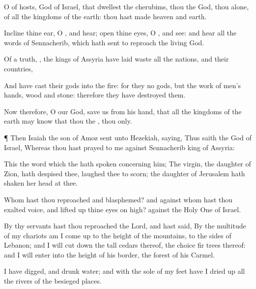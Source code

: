 {O
{} of
hosts,
God of
Israel, that
dwellest
{} the
cherubims, thou
{} the
God,
{} thou alone, of all the
kingdoms of the
earth: thou hast
made
heaven and
earth.

Incline thine
ear, O
{}, and
hear;
open thine
eyes, O
{}, and
see: and
hear all the
words of
Sennacherib, which hath
sent to
reproach the
living
God.

Of a
truth,
{}, the
kings of
Assyria have laid
waste all the
nations, and their
countries,

And have
cast their
gods into the
fire: for they
{} no
gods, but the
work of
men’s
hands,
wood and
stone: therefore they have
destroyed them.

Now therefore, O
{} our
God,
save us from his
hand, that all the
kingdoms of the
earth may
know that thou
{} the
{},
{} thou only.


\par }{\PP {}¶ Then
Isaiah the
son of
Amoz
sent unto
Hezekiah,
saying, Thus
saith the
{}
God of
Israel, Whereas thou hast
prayed to me against
Sennacherib
king of
Assyria:

This
{} the
word which the
{} hath
spoken concerning him; The
virgin, the
daughter of
Zion, hath
despised thee,
{} laughed thee to
scorn; the
daughter of
Jerusalem hath
shaken her
head at
thee.

Whom hast thou
reproached and
blasphemed? and against whom hast thou
exalted
{}
voice, and lifted
up thine
eyes on
high?
{} against the Holy
One of
Israel.

By thy
servants hast thou
reproached the
Lord, and hast
said, By the
multitude of my
chariots am I come
up to the
height of the
mountains, to the
sides of
Lebanon; and I will cut
down the
tall
cedars thereof,
{} the
choice fir
trees thereof: and I will
enter into the
height of his
border,
{} the
forest of his
Carmel.

I have
digged, and
drunk
water; and with the
sole of my
feet have I dried
up all the
rivers of the besieged
places.

}
